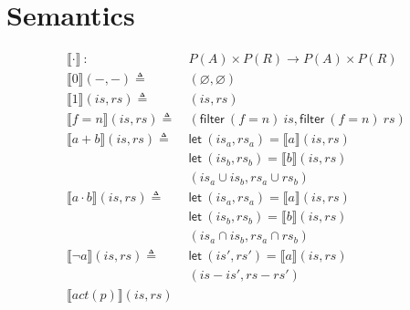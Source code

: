 \documentclass[12pt, letterpaper]{article}
\let\emptyset\varnothing
\newcommand\interp[1]{\llbracket #1 \rrbracket}
\begin{document}
\section{Semantics}
    \begin{align*}
        \interp{ \cdot }\ 
            :\ \ &
            P(A)\times P(R) \rightarrow P(A)\times P(R) 
            \\
        \interp{ 0 }(-, -)
            \triangleq\ &
            (\emptyset , \emptyset)
            \\ %
        \interp{ 1 }(\mathit{is}, \mathit{rs})
            \triangleq\ &
            (\mathit{is}, \mathit{rs})
            \\
        \interp{ f=n }(\mathit{is}, \mathit{rs})
            \triangleq\ &
            (\mathsf{filter}\ (f=n)\ \mathit{is},
             \mathsf{filter}\ (f=n)\ \mathit{rs}) 
            \\
        \interp{ a + b }(\mathit{is}, \mathit{rs})
            \triangleq\ &
            \mathsf{let}\ (\mathit{is}_a,\mathit{rs}_a) = \interp{ a }(\mathit{is}, \mathit{rs}) \\
            &\mathsf{let}\ (\mathit{is}_b,\mathit{rs}_b) =
            \interp{ b }(\mathit{is}, \mathit{rs}) \\
            &(\mathit{is}_a \cup \mathit{is}_b,\mathit{rs}_a \cup \mathit{rs}_b) 
            \\
        \interp { a \cdot b }(\mathit{is}, \mathit{rs})
            \triangleq\ &
            \mathsf{let}\ (\mathit{is}_a,\mathit{rs}_a) = \interp { a }(\mathit{is}, \mathit{rs}) \\
            &\mathsf{let}\ (\mathit{is}_b,\mathit{rs}_b) =
            \interp { b }(\mathit{is}, \mathit{rs}) \\
            &(\mathit{is}_a \cap \mathit{is}_b,\mathit{rs}_a \cap \mathit{rs}_b) 
            \\
        \interp { \neg a }(\mathit{is}, \mathit{rs})
            \triangleq\ &
            \mathsf{let}\ (\mathit{is}',\mathit{rs}') = \interp { a }(\mathit{is}, \mathit{rs}) \\
            &(\mathit{is} - \mathit{is}',\mathit{rs} - \mathit{rs}') 
            \\
        \interp { act(p) }(\mathit{is}, \mathit{rs})

\end{align*}
\end{document}
